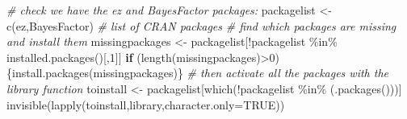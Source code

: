 \documentclass[
]{article}
\newenvironment{Shaded}{\begin{snugshade}}{\end{snugshade}}
\newcommand{\AttributeTok}[1]{\textcolor[rgb]{0.77,0.63,0.00}{#1}}
\newcommand{\CommentTok}[1]{\textcolor[rgb]{0.56,0.35,0.01}{\textit{#1}}}
\newcommand{\ConstantTok}[1]{\textcolor[rgb]{0.00,0.00,0.00}{#1}}
\newcommand{\ControlFlowTok}[1]{\textcolor[rgb]{0.13,0.29,0.53}{\textbf{#1}}}
\newcommand{\DecValTok}[1]{\textcolor[rgb]{0.00,0.00,0.81}{#1}}
\newcommand{\FunctionTok}[1]{\textcolor[rgb]{0.00,0.00,0.00}{#1}}
\newcommand{\NormalTok}[1]{#1}
\newcommand{\OtherTok}[1]{\textcolor[rgb]{0.56,0.35,0.01}{#1}}
\newcommand{\SpecialCharTok}[1]{\textcolor[rgb]{0.00,0.00,0.00}{#1}}
\newcommand{\StringTok}[1]{\textcolor[rgb]{0.31,0.60,0.02}{#1}}
\begin{document}
\begin{Shaded}
\begin{Highlighting}[]
\CommentTok{\# check we have the ez and BayesFactor packages:}
\NormalTok{packagelist }\OtherTok{\textless{}{-}} \FunctionTok{c}\NormalTok{(}\StringTok{\textquotesingle{}ez\textquotesingle{}}\NormalTok{,}\StringTok{\textquotesingle{}BayesFactor\textquotesingle{}}\NormalTok{) }\CommentTok{\# list of CRAN packages}
\CommentTok{\# find which packages are missing and install them}
\NormalTok{missingpackages }\OtherTok{\textless{}{-}}\NormalTok{ packagelist[}\SpecialCharTok{!}\NormalTok{packagelist }\SpecialCharTok{\%in\%} \FunctionTok{installed.packages}\NormalTok{()[,}\DecValTok{1}\NormalTok{]]}
\ControlFlowTok{if}\NormalTok{ (}\FunctionTok{length}\NormalTok{(missingpackages)}\SpecialCharTok{\textgreater{}}\DecValTok{0}\NormalTok{)\{}\FunctionTok{install.packages}\NormalTok{(missingpackages)\}}
\CommentTok{\# then activate all the packages with the library function}
\NormalTok{toinstall }\OtherTok{\textless{}{-}}\NormalTok{ packagelist[}\FunctionTok{which}\NormalTok{(}\SpecialCharTok{!}\NormalTok{packagelist }\SpecialCharTok{\%in\%}\NormalTok{ (}\FunctionTok{.packages}\NormalTok{()))]}
\FunctionTok{invisible}\NormalTok{(}\FunctionTok{lapply}\NormalTok{(toinstall,library,}\AttributeTok{character.only=}\ConstantTok{TRUE}\NormalTok{))}


\end{Highlighting}
\end{Shaded}
\end{document}
